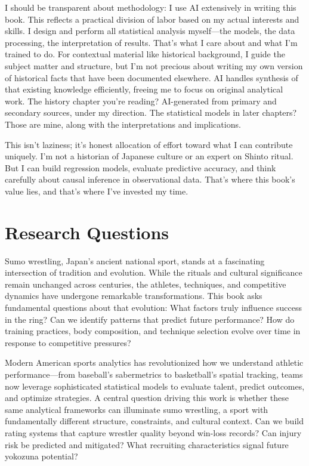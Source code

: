 I should be transparent about methodology: I use AI extensively in writing this book. This reflects a practical division of labor based on my actual interests and skills. I design and perform all statistical analysis myself—the models, the data processing, the interpretation of results. That's what I care about and what I'm trained to do. For contextual material like historical background, I guide the subject matter and structure, but I'm not precious about writing my own version of historical facts that have been documented elsewhere. AI handles synthesis of that existing knowledge efficiently, freeing me to focus on original analytical work. The history chapter you're reading? AI-generated from primary and secondary sources, under my direction. The statistical models in later chapters? Those are mine, along with the interpretations and implications.

This isn't laziness; it's honest allocation of effort toward what I can contribute uniquely. I'm not a historian of Japanese culture or an expert on Shinto ritual. But I can build regression models, evaluate predictive accuracy, and think carefully about causal inference in observational data. That's where this book's value lies, and that's where I've invested my time.

\section*{Research Questions}

Sumo wrestling, Japan's ancient national sport, stands at a fascinating intersection of tradition and evolution. While the rituals and cultural significance remain unchanged across centuries, the athletes, techniques, and competitive dynamics have undergone remarkable transformations. This book asks fundamental questions about that evolution: What factors truly influence success in the ring? Can we identify patterns that predict future performance? How do training practices, body composition, and technique selection evolve over time in response to competitive pressures?

Modern American sports analytics has revolutionized how we understand athletic performance---from baseball's sabermetrics to basketball's spatial tracking, teams now leverage sophisticated statistical models to evaluate talent, predict outcomes, and optimize strategies. A central question driving this work is whether these same analytical frameworks can illuminate sumo wrestling, a sport with fundamentally different structure, constraints, and cultural context. Can we build rating systems that capture wrestler quality beyond win-loss records? Can injury risk be predicted and mitigated? What recruiting characteristics signal future yokozuna potential?

